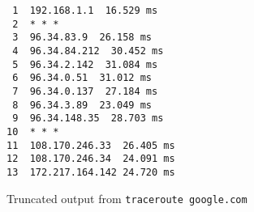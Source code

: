 \begin{code}
    \centering
    \begin{verbatim}
 1  192.168.1.1  16.529 ms
 2  * * *
 3  96.34.83.9  26.158 ms
 4  96.34.84.212  30.452 ms
 5  96.34.2.142  31.084 ms
 6  96.34.0.51  31.012 ms
 7  96.34.0.137  27.184 ms
 8  96.34.3.89  23.049 ms
 9  96.34.148.35  28.703 ms
10  * * *
11  108.170.246.33  26.405 ms
12  108.170.246.34  24.091 ms
13  172.217.164.142 24.720 ms
    \end{verbatim}
    \caption{Truncated output from \texttt{traceroute google.com}}
    \label{fig:sample_traceroute}
\end{code}
